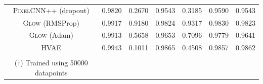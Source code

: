 {\begin{table}[tb]
{\begin{tabular}{ccccccc}
            \midrule
            \textsc{PixelCNN++} (dropout)  & 0.9820 & 0.2670 &   0.9543 & 0.3185 & 0.9590 & 0.9543 \\
            \textsc{Glow} (RMSProp)  &  0.9917  & 0.9180 & 0.9824 & 0.9317 & 0.9830  &  0.9823 \\
            \textsc{Glow} (Adam)   &0.9913 &  0.5658 & 0.9653 & 0.7096 & 0.9779 &  0.9641 \\
            \textsc{HVAE}  & 0.9943 &  0.1011  &  0.9865 &  0.4508 & 0.9857 &  0.9862\\
            \bottomrule
            \vspace{-0.2cm}\\
            ($\dagger$) Trained using 50000 datapoints
        \end{tabular}
        \label{tab_modelagnostic:mmd_pair2}
    }
\end{table}


}
